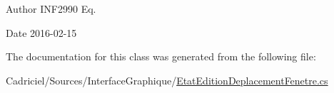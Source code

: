 \begin{DoxyAuthor}{Author}
I\+N\+F2990 Eq. 
\end{DoxyAuthor}
\begin{DoxyDate}{Date}
2016-\/02-\/15 
\end{DoxyDate}


The documentation for this class was generated from the following file\+:\begin{DoxyCompactItemize}
\item 
Cadriciel/\+Sources/\+Interface\+Graphique/\hyperlink{_etat_edition_deplacement_fenetre_8cs}{Etat\+Edition\+Deplacement\+Fenetre.\+cs}\end{DoxyCompactItemize}
